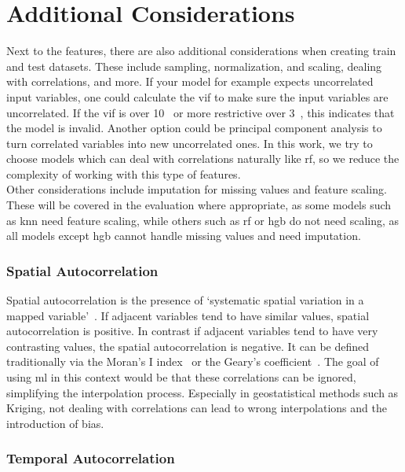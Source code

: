 \section{Additional Considerations}
\label{sec: additional considerations}

Next to the features, there are also additional considerations when creating train and test datasets. These include sampling, normalization, and scaling, dealing with correlations, and more. If your model for example expects uncorrelated input variables, one could calculate the \gls{vif} to make sure the input variables are uncorrelated. If the \gls{vif} is over 10~\cite{montgomery2021introduction} or more restrictive over 3~\cite{zuur2010protocol}, this indicates that the model is invalid. Another option could be principal component analysis to turn correlated variables into new uncorrelated ones. In this work, we try to choose models which can deal with correlations naturally like \gls{rf}, so we reduce the complexity of working with this type of features.\\
Other considerations include imputation for missing values and feature scaling. These will be covered in the evaluation where appropriate, as some models such as \gls{knn} need feature scaling, while others such as \gls{rf} or \gls{hgb} do not need scaling, as all models except \gls{hgb} cannot handle missing values and need imputation.

\subsubsection{Spatial Autocorrelation}

Spatial autocorrelation is the presence of `systematic spatial variation in a mapped variable'~\cite{haining2001spatial}. If adjacent variables tend to have similar values, spatial autocorrelation is positive. In contrast if adjacent variables tend to have very contrasting values, the spatial autocorrelation is negative. It can be defined traditionally via the Moran's I index~\cite{moran1948interpretation} or the Geary's coefficient~\cite{geary1954contiguity}. The goal of using \gls{ml} in this context would be that these correlations can be ignored, simplifying the interpolation process. Especially in geostatistical methods such as Kriging, not dealing with correlations can lead to wrong interpolations and the introduction of bias.\\

\subsubsection{Temporal Autocorrelation}

